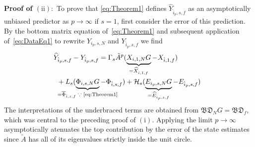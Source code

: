 \noindent\textbf{Proof of $\mathrm{(ii)}:$} To prove that \eqref{eq:Theorem1} defines $\widehat{Y}_{\hat{i}_p,s,f}$ as an asymptotically unbiased predictor as $p\rightarrow\infty$ if $s=1$, first consider the error of this prediction. By the bottom matrix equation of~\eqref{eq:Theorem1} and subsequent application of~\eqref{eq:DataEq1} to rewrite $Y_{i_p,s,N}$ and $Y_{\hat{i}_p,s,f}$ we find
\begin{align}\label{eq:Yf_error1}
    \begin{split}
        &\!\!\!\widehat{Y}_{\hat{i}_p,s,f}-Y_{\hat{i}_p,s,f} = \Gamma_s \tilde{A}^p (\underbrace{X_{i,1,N}G}_{=\widehat{X}_{\hat{i},1,f}}-X_{\hat{i},1,f}) \\
        &+L_s(\underbrace{\Phi_{i,s,N}G}_{\mathclap{=\overline{\Phi}_{\hat{i},s,f} \;\because \text{ \eqref{eq:Theorem1}}}}-\Phi_{\hat{i},s,f}) +\mathcal{H}_s (\underbrace{E_{i_p,s,N}G}_{=\widehat{E}_{\hat{i}_p,s,f}}-E_{\hat{i}_p,s,f})
    \end{split}
\end{align}
The interpretations of the underbraced terms are obtained from $\mathfrak{BD}_N G=\mathfrak{BD}_f$, which was central to the preceding proof of $\mathrm{(i)}$. Applying the limit $p\rightarrow\infty$ asymptotically atenuates the top contribution by the error of the state estimates since $\tilde{A}$ has all of its eigenvalues strictly inside the unit circle.


